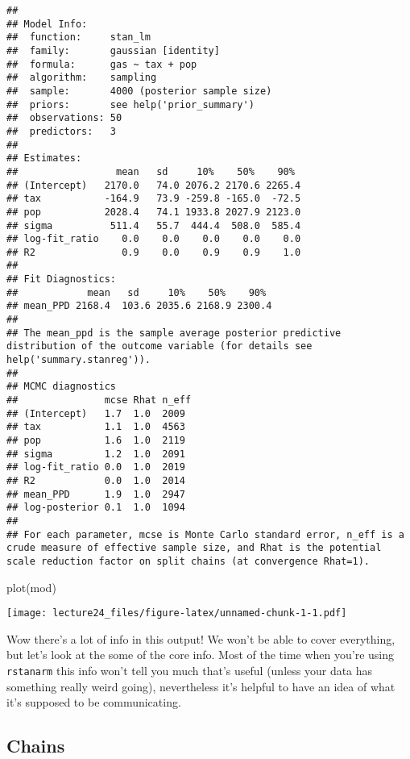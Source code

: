 \documentclass[
]{article}
\newenvironment{Shaded}{\begin{snugshade}}{\end{snugshade}}
\newcommand{\FunctionTok}[1]{\textcolor[rgb]{0.00,0.00,0.00}{#1}}
\newcommand{\NormalTok}[1]{#1}
\begin{document}
\begin{verbatim}
## 
## Model Info:
##  function:     stan_lm
##  family:       gaussian [identity]
##  formula:      gas ~ tax + pop
##  algorithm:    sampling
##  sample:       4000 (posterior sample size)
##  priors:       see help('prior_summary')
##  observations: 50
##  predictors:   3
## 
## Estimates:
##                 mean   sd     10%    50%    90% 
## (Intercept)   2170.0   74.0 2076.2 2170.6 2265.4
## tax           -164.9   73.9 -259.8 -165.0  -72.5
## pop           2028.4   74.1 1933.8 2027.9 2123.0
## sigma          511.4   55.7  444.4  508.0  585.4
## log-fit_ratio    0.0    0.0    0.0    0.0    0.0
## R2               0.9    0.0    0.9    0.9    1.0
## 
## Fit Diagnostics:
##            mean   sd     10%    50%    90% 
## mean_PPD 2168.4  103.6 2035.6 2168.9 2300.4
## 
## The mean_ppd is the sample average posterior predictive distribution of the outcome variable (for details see help('summary.stanreg')).
## 
## MCMC diagnostics
##               mcse Rhat n_eff
## (Intercept)   1.7  1.0  2009 
## tax           1.1  1.0  4563 
## pop           1.6  1.0  2119 
## sigma         1.2  1.0  2091 
## log-fit_ratio 0.0  1.0  2019 
## R2            0.0  1.0  2014 
## mean_PPD      1.9  1.0  2947 
## log-posterior 0.1  1.0  1094 
## 
## For each parameter, mcse is Monte Carlo standard error, n_eff is a crude measure of effective sample size, and Rhat is the potential scale reduction factor on split chains (at convergence Rhat=1).
\end{verbatim}

\begin{Shaded}
\begin{Highlighting}[]
\FunctionTok{plot}\NormalTok{(mod)}
\end{Highlighting}
\end{Shaded}

\texttt{[image: lecture24\_files/figure-latex/unnamed-chunk-1-1.pdf]}

Wow there's a lot of info in this output! We won't be able to cover
everything, but let's look at the some of the core info. Most of the
time when you're using \texttt{rstanarm} this info won't tell you much
that's useful (unless your data has something really weird going),
nevertheless it's helpful to have an idea of what it's supposed to be
communicating.

\hypertarget{chains}{%
\subsection{Chains}\label{chains}}
\end{document}
